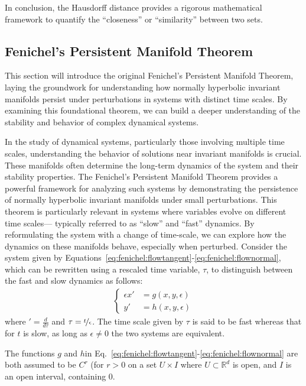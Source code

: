 \documentclass{article} %
\newcounter{ct}
\newcommand{\reals}{\mathbb{R}}
\theoremstyle{definition}
\theoremstyle{remark}
\begin{document}
In conclusion, the Hausdorff distance provides a rigorous mathematical framework to quantify the ``closeness'' or ``similarity'' between two sets.




\subsection{Fenichel's Persistent Manifold Theorem}

This section will introduce the original Fenichel's Persistent Manifold Theorem, laying the groundwork for understanding how normally hyperbolic invariant manifolds persist under perturbations in systems with distinct time scales.
 By examining this foundational theorem, we can build a deeper understanding of the stability and behavior of complex dynamical systems.

In the study of dynamical systems, particularly those involving multiple time scales, understanding the behavior of solutions near invariant manifolds is crucial.
These manifolds often determine the long-term dynamics of the system and their stability properties.
 The Fenichel's Persistent Manifold Theorem provides a powerful framework for analyzing such systems by demonstrating the persistence of normally hyperbolic invariant manifolds under small perturbations. This theorem is particularly relevant in systems where variables evolve on different time scales--- typically referred to as ``slow'' and ``fast'' dynamics.
 By reformulating the system with a change of time-scale, we can explore how the dynamics on these manifolds behave, especially when perturbed.
Consider the system given by Equations~\ref{eq:fenichel:flowtangent}-\ref{eq:fenichel:flownormal}, which can be rewritten using a rescaled time variable, \(\tau\), to distinguish between the fast and slow dynamics as follows:
\begin{align}\label{eq:slow}
\begin{cases}
\epsilon x' &= g (x, y , \epsilon) \\
y'&= h(x, y, \epsilon)
\end{cases}
\end{align}
where  \('=\frac{d}{d\tau}\) and \(\tau=\nicefrac{t}{\epsilon}\).
 The time scale given by \(\tau\) is said to be fast whereas that for \(t\) is slow, as long as \(\epsilon\neq 0\) the two systems are equivalent.


The functions \(g\) and \(h\)in Eq.~\ref{eq:fenichel:flowtangent}-\ref{eq:fenichel:flownormal} are both assumed to be \(C^{r}\) (for \(r>0\) on a set \(U \times I\) where \(U\subset\reals^{d}\) is open, and \(I\) is an open interval, containing \(0\).
\end{document}
